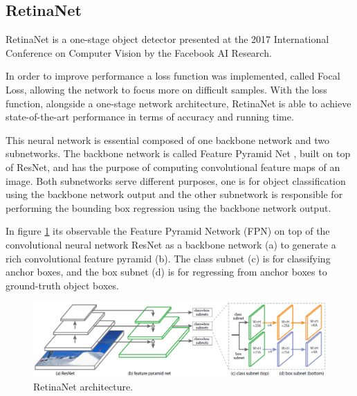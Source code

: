     \subsection{RetinaNet}

    RetinaNet is a one-stage object detector presented at the 2017 International Conference on Computer Vision by the Facebook AI Research.\par

    In order to improve performance a loss function was implemented, called Focal Loss, allowing the network to focus more on difficult samples. With the loss function, alongside a one-stage network architecture, RetinaNet is able to achieve state-of-the-art performance in terms of accuracy and running time.\par

    This neural network is essential composed of one backbone network and two subnetworks. The backbone network is called Feature Pyramid Net \cite{lin2016feature}, built on top of ResNet, and has the purpose of computing convolutional feature maps of an image. Both subnetworks serve different purposes, one is for object classification using the backbone network output and the other subnetwork is responsible for performing the bounding box regression using the backbone network output.\cite{Lin2017} \par

    In figure \ref{fig:retinanet} its observable the Feature Pyramid Network (FPN) on top of the convolutional neural network ResNet as a backbone network (a) to generate a rich convolutional feature pyramid (b). The class subnet (c) is for classifying anchor boxes, and the box subnet (d) is for regressing from anchor boxes to ground-truth object boxes. \par 


    \begin{figure}[htb]
        \centering
        \includegraphics[scale = 0.37]{Sections/2StateOfTheArt/2_images/RetinaNet.png}
        \caption{RetinaNet architecture.\cite{Lin2017}} 
        \label{fig:retinanet}
    \end{figure}

